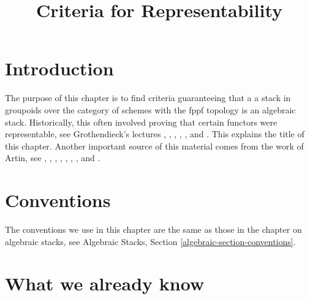 

%


\title{Criteria for Representability}

\maketitle

\label{section-phantom}

\tableofcontents




\section{Introduction}
\label{section-introduction}

\noindent
The purpose of this chapter is to find criteria guaranteeing that a
a stack in groupoids over the category of schemes with the fppf topology
is an algebraic stack. Historically, this often involved proving that
certain functors were representable, see Grothendieck's lectures
\cite{Gr-I},
\cite{Gr-II},
\cite{Gr-III},
\cite{Gr-IV},
\cite{Gr-V}, and
\cite{Gr-VI}.
This explains the title of this chapter. Another important source
of this material comes from the work of Artin, see
\cite{ArtinI},
\cite{ArtinII},
\cite{Artin-Theorem-Representability},
\cite{Artin-Construction-Techniques},
\cite{Artin-Algebraic-Spaces},
\cite{Artin-Algebraic-Approximation},
\cite{Artin-Implicit-Function}, and
\cite{ArtinVersal}.



\section{Conventions}
\label{section-conventions}

\noindent
The conventions we use in this chapter are the same as those in the
chapter on algebraic stacks, see
Algebraic Stacks, Section \ref{algebraic-section-conventions}.




\section{What we already know}
\label{section-done-so-far}

